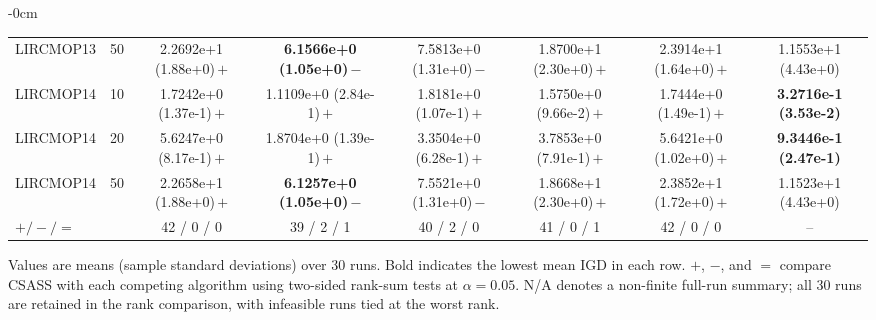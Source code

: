 \begin{table}[!htbp]
\begin{ROneBlock}
\begin{adjustwidth}{-\extralength}{0cm}
\begin{tabular*}{\linewidth}{@{\extracolsep{\fill}}llcccccc@{}}
LIRCMOP13 & 50 & 2.2692e+1 (1.88e+0)\,$+$ & \textbf{6.1566e+0 (1.05e+0)}\,$-$ & 7.5813e+0 (1.31e+0)\,$-$ & 1.8700e+1 (2.30e+0)\,$+$ & 2.3914e+1 (1.64e+0)\,$+$ & 1.1553e+1 (4.43e+0) \\
LIRCMOP14 & 10 & 1.7242e+0 (1.37e-1)\,$+$ & 1.1109e+0 (2.84e-1)\,$+$ & 1.8181e+0 (1.07e-1)\,$+$ & 1.5750e+0 (9.66e-2)\,$+$ & 1.7444e+0 (1.49e-1)\,$+$ & \textbf{3.2716e-1 (3.53e-2)} \\
LIRCMOP14 & 20 & 5.6247e+0 (8.17e-1)\,$+$ & 1.8704e+0 (1.39e-1)\,$+$ & 3.3504e+0 (6.28e-1)\,$+$ & 3.7853e+0 (7.91e-1)\,$+$ & 5.6421e+0 (1.02e+0)\,$+$ & \textbf{9.3446e-1 (2.47e-1)} \\
LIRCMOP14 & 50 & 2.2658e+1 (1.88e+0)\,$+$ & \textbf{6.1257e+0 (1.05e+0)}\,$-$ & 7.5521e+0 (1.31e+0)\,$-$ & 1.8668e+1 (2.30e+0)\,$+$ & 2.3852e+1 (1.72e+0)\,$+$ & 1.1523e+1 (4.43e+0) \\
\midrule
$+/-/=$ & & 42 / 0 / 0 & 39 / 2 / 1 & 40 / 2 / 0 & 41 / 0 / 1 & 42 / 0 / 0 & -- \\
\bottomrule
\end{tabular*}
\vspace{3pt}
\parbox{\linewidth}{\footnotesize Values are means (sample standard deviations) over 30 runs. Bold indicates the lowest mean IGD in each row. $+$, $-$, and $=$ compare CSASS with each competing algorithm using two-sided rank-sum tests at $\alpha=0.05$. N/A denotes a non-finite full-run summary; all 30 runs are retained in the rank comparison, with infeasible runs tied at the worst rank.}
\end{adjustwidth}
\end{ROneBlock}
\end{table}
